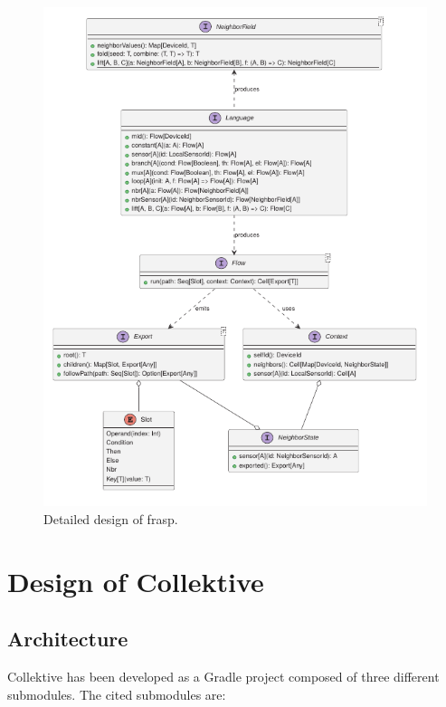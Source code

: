 \begin{figure}
    \centering
    \includegraphics[width=\linewidth]{figures/FRASP-design.pdf}
    \caption{Detailed design of \ac{frasp}.}
    \label{fig:frasp-design}
\end{figure}

\section{Design of Collektive}
\label{section:design-of-collektive}

\subsection{Architecture}
\label{subsection:collektive-architecture}

Collektive has been developed as a Gradle project composed of three different submodules. The cited submodules are:

